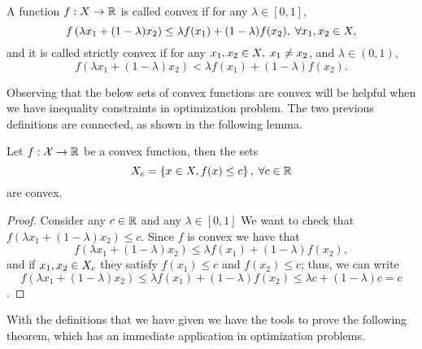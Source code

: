 \begin{definition}
    A function $f: X \to \mathbb{R}$ is called convex if for any $\lambda \in [0, 1]$,
    \begin{equation}
        \nonumber
        f\left(\lambda x_1 + (1 - \lambda) x_2 \right) \leq \lambda f(x_1) + (1 - \lambda) f(x_2) , \; \forall x_1, x_2 \in X ,
    \end{equation}
    and it is called strictly convex if for any $x_1, x_2 \in X, \; x_1 \neq x_2$, and $\lambda \in (0, 1)$,
    \begin{equation}
        \nonumber
        f\left(\lambda x_1 + (1 - \lambda) x_2 \right) < \lambda f(x_1) + (1 - \lambda) f(x_2) .
    \end{equation}
\end{definition}

Observing that the below sets of convex functions are convex will be helpful when we have inequality constraints in optimization problem.
The two previous definitions are connected, as shown in the following lemma.
\begin{lemma}
    Let $f: \mathcal{X} \to \mathbb{R}$ be a convex function, then the sets
    $$X_c = \left\{x \in X, f(x) \leq c\right\}, \; \forall c \in \mathbb{R}$$
    are convex.
\end{lemma}
\begin{proof}
    Consider any $c \in \mathbb{R}$ and any $\lambda \in [0, 1]$
    We want to check that $f(\lambda x_1 + (1 - \lambda) x_2) \leq c$.
    Since $f$ is convex we have that 
    $$f\left(\lambda x_1 + (1 - \lambda) x_2 \right) \leq \lambda f(x_1) + (1 - \lambda) f(x_2) ,$$
    and if $x_1, x_2 \in X_c$ they satisfy
    $f(x_1) \leq c$ and $f(x_2) \leq c$; thus, we can write 
    $$f\left(\lambda x_1 + (1 - \lambda) x_2 \right) \leq \lambda f(x_1) + (1 - \lambda) f(x_2) \leq \lambda c + (1 - \lambda) c = c$$.
\end{proof}

With the definitions that we have given we have the tools to prove the following theorem, which has an immediate application in optimization problems.

